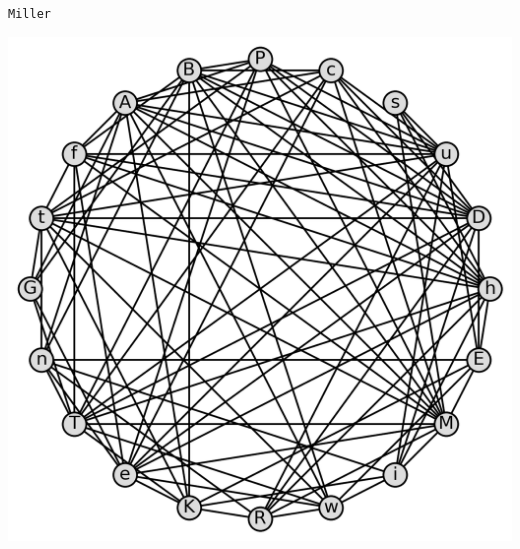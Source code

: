 \documentclass{article}
\newcommand{\puzzleTitle}[1]{
\begin{center}
{\Large \texttt{#1}}
\end{center}
}
\begin{document}
\newpage

\puzzleTitle{Miller}

\vfill



\begin{center}
\includegraphics[width=\linewidth]{early-drafts/independent-graph.png}
\end{center}

\vfill

\newpage
\end{document}
